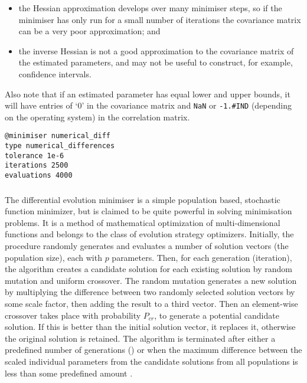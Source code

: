 \begin{itemize}
\item the Hessian approximation develops over many minimiser steps, so if the minimiser has only run for a small number of iterations the covariance matrix can be a very poor approximation; and
\item the inverse Hessian is not a good approximation to the covariance matrix of the estimated parameters, and may not be useful to construct, for example, confidence intervals. 
\end{itemize}

Also note that if an estimated parameter has equal lower and upper bounds, it will have entries of `0' in the covariance matrix and \texttt{NaN} or \texttt{-1.\#IND} (depending on the operating system) in the correlation matrix. 

{\small{\begin{verbatim}
@minimiser numerical_diff
type numerical_differences
tolerance 1e-6
iterations 2500
evaluations 4000
\end{verbatim}}}

\subsubsection{}

The differential evolution minimiser is a simple population based, stochastic function minimizer, but is claimed to be quite powerful in solving minimisation problems. It is a method of mathematical optimization of multi-dimensional functions and belongs to the class of evolution strategy optimizers. Initially, the procedure randomly generates and evaluates a number of solution vectors (the population size), each with $p$ parameters. Then, for each generation (iteration), the algorithm creates a candidate solution for each existing solution by random mutation and uniform crossover. The random mutation generates a new solution by multiplying the difference between two randomly selected solution vectors by some scale factor, then adding the result to a third vector. Then an element-wise crossover takes place with probability $P_{cr}$, to generate a potential candidate solution. If this is better than the initial solution vector, it replaces it, otherwise the original solution is retained. The algorithm is terminated after either a predefined number of generations () or when the maximum difference between the scaled individual parameters from the candidate solutions from all populations is less than some predefined amount .

